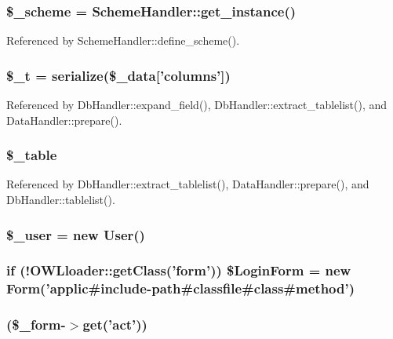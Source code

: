 \subsubsection[{\$\_\-scheme}]{\setlength{\rightskip}{0pt plus 5cm}\$\_\-scheme = SchemeHandler::get\_\-instance()}\label{index_8php_abb5321c25f21f089f5c253d5f2697502}


Referenced by SchemeHandler::define\_\-scheme().

\subsubsection[{\$\_\-t}]{\setlength{\rightskip}{0pt plus 5cm}\$\_\-t = serialize(\$\_\-data\mbox{[}'columns'\mbox{]})}\label{index_8php_a7a22c26026cc0626b015085e752b45cb}


Referenced by DbHandler::expand\_\-field(), DbHandler::extract\_\-tablelist(), and DataHandler::prepare().

\subsubsection[{\$\_\-table}]{\setlength{\rightskip}{0pt plus 5cm}\$\_\-table}\label{index_8php_ac0ee5b766d19cb282552a3449a1f8376}


Referenced by DbHandler::extract\_\-tablelist(), DataHandler::prepare(), and DbHandler::tablelist().

\subsubsection[{\$\_\-user}]{\setlength{\rightskip}{0pt plus 5cm}\$\_\-user = new {\bf User}()}\label{index_8php_a5df5982b9dadc74df05081972cd67fdf}
\subsubsection[{\$LoginForm}]{\setlength{\rightskip}{0pt plus 5cm}if (!OWLloader::getClass('form')) \$LoginForm = new {\bf Form}('applic\#include-\/path\#classfile\#class\#method')}\label{index_8php_ae89d28a5f6ccd73a8cb4a0253db78766}
\subsubsection[{switch}]{(\$\_\-form-\/$>$get('act'))}\label{index_8php_aa284f7d5270c1aa684d885f7bb70d532}
